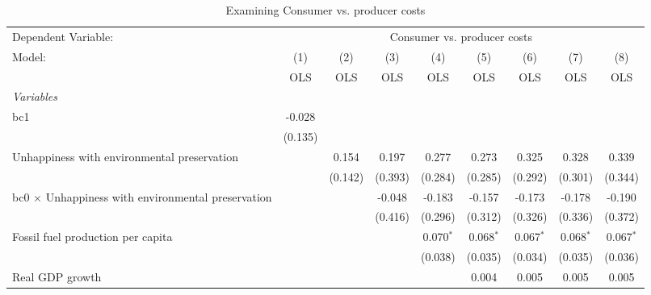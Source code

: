 
\begin{table}[htbp]
   \caption{Examining Consumer vs. producer costs}
   \centering
   \begin{tabular}{lcccccccc}
      \toprule
      Dependent Variable: & \multicolumn{8}{c}{Consumer vs. producer costs}\\
      Model:                                                    & (1)     & (2)     & (3)     & (4)         & (5)         & (6)         & (7)         & (8)\\  
                                                                &  OLS    & OLS     & OLS     & OLS         & OLS         & OLS         & OLS         & OLS\\  
      \midrule
      \emph{Variables}\\
      bc1                                                       & -0.028  &         &         &             &             &             &             &   \\   
                                                                & (0.135) &         &         &             &             &             &             &   \\   
      Unhappiness with environmental preservation               &         & 0.154   & 0.197   & 0.277       & 0.273       & 0.325       & 0.328       & 0.339\\   
                                                                &         & (0.142) & (0.393) & (0.284)     & (0.285)     & (0.292)     & (0.301)     & (0.344)\\   
      bc0 $\times$ Unhappiness with environmental preservation  &         &         & -0.048  & -0.183      & -0.157      & -0.173      & -0.178      & -0.190\\   
                                                                &         &         & (0.416) & (0.296)     & (0.312)     & (0.326)     & (0.336)     & (0.372)\\   
      Fossil fuel production per capita                         &         &         &         & 0.070$^{*}$ & 0.068$^{*}$ & 0.067$^{*}$ & 0.068$^{*}$ & 0.067$^{*}$\\   
                                                                &         &         &         & (0.038)     & (0.035)     & (0.034)     & (0.035)     & (0.036)\\   
      Real GDP growth                                           &         &         &         &             & 0.004       & 0.005       & 0.005       & 0.005\\   

\end{tabular}
\end{table}
